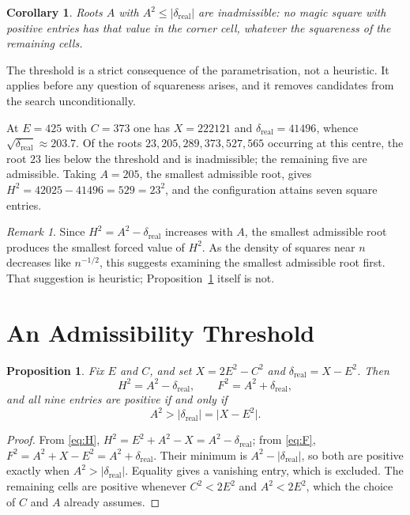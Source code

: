 \documentclass[12pt]{article}
\newtheorem{proposition}[theorem]{Proposition}
\newtheorem{corollary}[theorem]{Corollary}
\theoremstyle{remark}
\newtheorem{remark}[theorem]{Remark}
\begin{document}
\begin{corollary}
Roots $A$ with $A^2 \le |\delta_{\text{real}}|$ are inadmissible: no magic square
with positive entries has that value in the corner cell, whatever the
squareness of the remaining cells.
\end{corollary}

The threshold is a strict consequence of the parametrisation, not a
heuristic. It applies before any question of squareness arises, and it
removes candidates from the search unconditionally.

At $E = 425$ with $C = 373$ one has $X = 222121$ and
$\delta_{\text{real}} = 41496$, whence $\sqrt{\delta_{\text{real}}} \approx 203.7$. Of the roots
$23, 205, 289, 373, 527, 565$ occurring at this centre, the root $23$
lies below the threshold and is inadmissible; the remaining five are
admissible. Taking $A = 205$, the smallest admissible root, gives
$H^2 = 42025 - 41496 = 529 = 23^2$, and the configuration attains seven
square entries.

\begin{remark}
Since $H^2 = A^2 - \delta_{\text{real}}$ increases with $A$, the smallest admissible
root produces the smallest forced value of $H^2$. As the density of
squares near $n$ decreases like $n^{-1/2}$, this suggests examining the
smallest admissible root first. That suggestion is heuristic;
Proposition~\ref{prop:threshold} itself is not.
\end{remark}

\section{An Admissibility Threshold}

\begin{proposition}\label{prop:threshold}
Fix $E$ and $C$, and set $X = 2E^2 - C^2$ and $\delta_{\text{real}} = X - E^2$. Then
\[
H^2 = A^2 - \delta_{\text{real}}, \qquad F^2 = A^2 + \delta_{\text{real}} ,
\]
and all nine entries are positive if and only if
\[
A^2 > \lvert \delta_{\text{real}} \rvert = \lvert X - E^2 \rvert .
\]
\end{proposition}

\begin{proof}
From \eqref{eq:H}, $H^2 = E^2 + A^2 - X = A^2 - \delta_{\text{real}}$; from
\eqref{eq:F}, $F^2 = A^2 + X - E^2 = A^2 + \delta_{\text{real}}$. Their minimum is
$A^2 - \lvert\delta_{\text{real}}\rvert$, so both are positive exactly when
$A^2 > \lvert\delta_{\text{real}}\rvert$. Equality gives a vanishing entry, which is
excluded. The remaining cells are positive whenever $C^2 < 2E^2$ and
$A^2 < 2E^2$, which the choice of $C$ and $A$ already assumes.
\end{proof}
\end{document}
